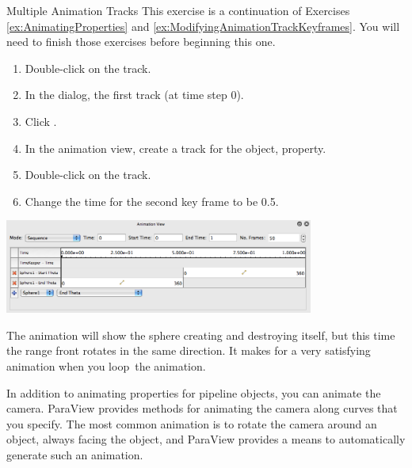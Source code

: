\begin{exercise}{Multiple Animation Tracks}
  \label{ex:MultipleAnimationTracks}%
  This exercise is a continuation of Exercises \ref{ex:AnimatingProperties}
  and \ref{ex:ModifyingAnimationTrackKeyframes}.  You will need to finish
  those exercises before beginning this one.

  \begin{enumerate}
  \item Double-click on the  track.
  \item In the  dialog,  the first
    track (at time step 0).
  \item Click .
  \item In the animation view, create a track for the  object,
     property.
  \item Double-click on the  track.
  \item Change the time for the second key frame to be 0.5.
  \end{enumerate}

  \begin{inlinefig}
    \includegraphics[width=4in]{images/BuildAnimation3}
  \end{inlinefig}

  The animation will show the sphere creating and destroying itself, but this
  time the range front rotates in the same direction.  It makes for a very
  satisfying animation when you loop~\vcrLoop the animation.
\end{exercise}

In addition to animating properties for pipeline objects, you can animate
the camera.  ParaView provides methods for animating the camera along
curves that you specify.  The most common animation is to rotate the camera
around an object, always facing the object, and ParaView provides a means
to automatically generate such an animation.

